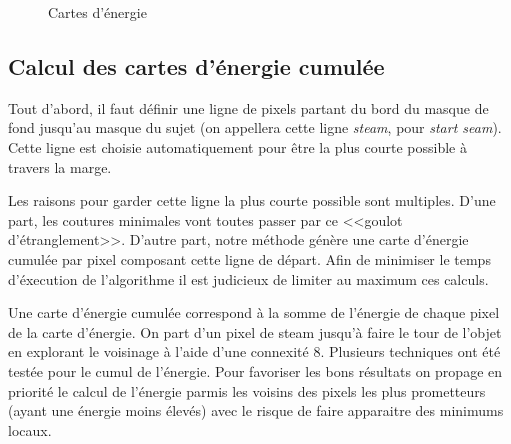 \documentclass[a4paper]{article}
\begin{document}
\begin{figure}[!ht]%
    \centering
    \hspace{0.030\textwidth}
    \caption{Cartes d'énergie}
    \label{energie}
\end{figure}

\subsection{Calcul des cartes d'énergie cumulée}

Tout d'abord, il faut définir une ligne de pixels partant du bord du masque de fond jusqu'au masque du sujet (on appellera
cette ligne {\em steam}, pour {\em start seam}). %
Cette ligne est choisie automatiquement pour être la plus courte possible à travers la marge.

Les raisons pour garder cette ligne la plus courte possible sont multiples. D'une part, les coutures minimales
vont toutes passer par ce <<goulot d'étranglement>>. D'autre part, notre méthode génère une carte d'énergie
cumulée par pixel composant cette ligne de départ. Afin de minimiser le temps d'éxecution de l'algorithme il
est judicieux de limiter au maximum ces calculs.

Une carte d’énergie cumulée correspond à la somme de l'énergie de chaque pixel de la carte d'énergie. 
On part d’un pixel de steam jusqu’à faire le tour de l’objet en explorant le voisinage à l'aide d'une connexité 8.
Plusieurs techniques ont été testée pour le cumul de l'énergie. Pour favoriser les bons résultats on propage
en priorité le calcul de l'énergie parmis les voisins des pixels les plus prometteurs (ayant une énergie moins élevés) 
avec le risque de faire apparaitre des minimums locaux.
\end{document}
